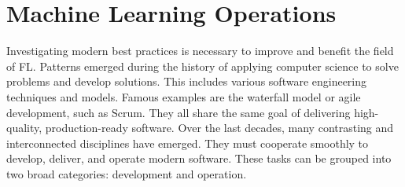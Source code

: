 
\section{Machine Learning Operations} \label{section:machine_learning_operations}

Investigating modern best practices is necessary to improve and benefit the field of FL.
Patterns emerged during the history of applying computer science to solve problems and develop solutions.
This includes various software engineering techniques and models.
Famous examples are the waterfall model or agile development, such as Scrum.
They all share the same goal of delivering high-quality, production-ready software.
Over the last decades, many contrasting and interconnected disciplines have emerged.
They must cooperate smoothly to develop, deliver, and operate modern software.
These tasks can be grouped into two broad categories: development and operation.




